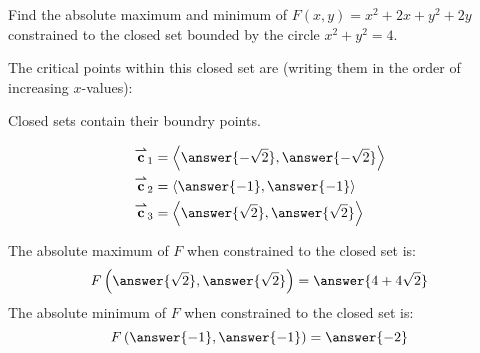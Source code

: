 \documentclass{ximera}
\author{Gregory Hartman \and Bart Snapp}
\begin{document}
\begin{exercise}
  Find the absolute maximum and minimum of $F(x,y) = x^2+2x+y^2+2y$
  constrained to the closed set bounded by the circle $x^2+y^2=4$.
  
  \begin{prompt}
    The critical points within this closed set are (writing
    them in the order of increasing $x$-values):
    \begin{hint}
      Closed sets contain their boundry points.
    \end{hint}
    \begin{align*}
      \vec{c}_1 &= \vector{\answer{-\sqrt{2}},\answer{-\sqrt{2}}}\\
      \vec{c}_2 &= \vector{\answer{-1},\answer{-1}}\\
      \vec{c}_3 &= \vector{\answer{\sqrt{2}},\answer{\sqrt{2}}}
    \end{align*}
    \begin{exercise}
      The absolute maximum of $F$ when constrained to the closed set is:
      \[
      F\left(\answer{\sqrt{2}},\answer{\sqrt{2}}\right) = \answer{4+4\sqrt{2}}
      \]
      The absolute minimum of $F$ when constrained to the closed set is:
      \[
      F\left(\answer{-1},\answer{-1}\right) = \answer{-2}
    \]
    \end{exercise}
  \end{prompt}
\end{exercise}
\end{document}
